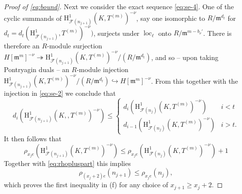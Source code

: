 \documentclass[a4paper,10pt]{amsart}
\numberwithin{equation}{section}
\numberwithin{equation}{section}
\theoremstyle{plain}
\theoremstyle{definition}
\theoremstyle{definition}
\theoremstyle{plain}
\theoremstyle{plain}
\theoremstyle{plain}
\theoremstyle{plain}
\newcommand{\F}{\mathcal{F}}
\DeclareMathOperator{\loc}{loc}
\newcommand{\cF}{\mathcal{F}}
\newcommand{\fm}{\mathfrak{m}}
\newcommand{\rH}{\mathrm{H}}
\begin{document}
\begin{proof}[Proof of \eqref{eq:bound}]
Next we consider the exact sequence \eqref{eq:se-4}. 
One of the cyclic summands of $\rH^1_{\cF(n_{j+1})}(K,T^{(m)})^{-\nu}$, say one isomorphic to $R/\fm^{d_t}$ for $d_t = d_t(\rH^1_{\cF(n_{j+1})},T^{(m)})^{-\nu})$,
surjects under $\loc_\ell$ onto $R/\fm^{m-b_{\nu}'}$.  There is therefore an $R$-module surjection $H[\fm^m]^{-\nu}\twoheadrightarrow \rH^1_{\cF(n_{j+1})}(K,T^{(m)})^{-\nu}/(R/\fm^{d_t})$, and so -- upon taking Pontryagin duals -- an $R$-module injection
$\rH^1_{\cF(n_{j+1})}(K,T^{(m)})^{-\nu}/(R/\fm^{d_t})\hookrightarrow H[\fm^m]^{-\nu}$. From this together with the injection in \eqref{eq:se-2} we conclude
that
\begin{equation}\label{eq:missingd}
d_i(\rH^1_{\cF(n_{j+1})}(K,,T^{(m)})^{-\nu}) \leq \begin{cases} d_i(\rH^1_{\cF(n_{j})}(K,T^{(m)})^{-\nu}) & i< t \\ 
 d_{i-1}(\rH^1_{\cF(n_{j})}(K,T^{(m)})^{-\nu}) & i>t.\end{cases}
 \end{equation}
 It then follows that
 \begin{equation*}\label{eq:minusineq}
  \rho_{x_je}(\rH^1_{\cF(n_{j+1})}(K,T^{(m)})^{-\nu}) \leq \rho_{x_je}(\rH^1_{\cF(n_{j})}(K,T^{(m)})^{-\nu})+1
 \end{equation*}
 Together with \eqref{eq:rhopluspart} this implies
 \begin{equation}\label{eq:rhofirstineq}
 \rho_{(x_j+2)e}(n_{j+1}) \leq \rho_{x_je}(n_j),
 \end{equation}
 which proves the first inequality in (f) for any choice of $x_{j+1}\geq x_j+2$.
 


\end{proof}
\end{document}
